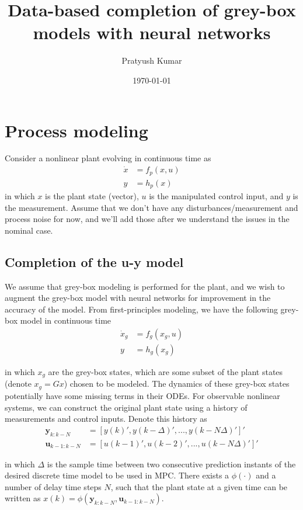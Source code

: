 \documentclass{article}
\title{Data-based completion of grey-box models with neural networks}
\author{Pratyush Kumar}
\date{\today}
\begin{document}
\maketitle

\section{Process modeling}
Consider a nonlinear plant evolving in continuous time as
\begin{align*}
  \dot x &= f_p(x, u) \\
  y &= h_p(x)
\end{align*}
in which $x$ is the plant state (vector), $u$ is the manipulated control input,
and $y$ is the measurement. Assume that we don't have any 
disturbances/measurement and process noise 
for now, and we'll add those after we 
understand the issues in the nominal case.

\subsection{Completion of the u-y model}
We assume that grey-box modeling is performed 
for the plant, and we wish to augment the grey-box model with neural networks
for improvement in the accuracy of the model. From first-principles modeling, 
we have the following grey-box model in continuous time
\begin{align*}
  \dot{x}_g &= f_g(x_g, u) \\
  y &= h_g(x_g)
\end{align*}

in which $x_g$ are the grey-box states, which are some subset 
of the plant states (denote $x_g = Gx$) chosen to 
be modeled. The dynamics of these grey-box states 
potentially have some missing terms 
in their ODEs.
For observable nonlinear systems, 
we can construct the original plant state
using a history of measurements and control inputs.
Denote this history as 
\begin{align*}
  \mathbf{y}_{k:k-N} &= [y(k)', y(k-\Delta)', ..., y(k-N\Delta)']' \\
  \mathbf{u}_{k-1:k-N} &= [u(k-1)', u(k-2)', ..., u(k-N\Delta)']'
\end{align*}

in which $\Delta$ is the sample 
time between two consecutive
prediction instants of the desired discrete time 
model to be used in MPC. There exists a $\phi(\cdot)$ 
and a number of delay 
time steps $N$, such that the plant state
at a given time can be written as
$x(k) = \phi(\mathbf{y}_{k:k-N}, \mathbf{u}_{k-1:k-N})$.
\end{document}
